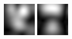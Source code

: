 \begin{figure}[ht]
\begin{center}
 \includegraphics[width=\columnwidth/9]{ch4/figures/mag_3_3.jpg}
 \includegraphics[width=\columnwidth/9]{ch4/figures/mag_3_4.jpg}

\end{center}
\end{figure}
